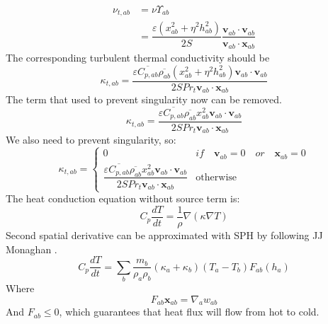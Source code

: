 \documentclass[journal abbreviation, manuscript]{copernicus}
\begin{document}
\begin{equation}
\begin{split}
\nu_{t,ab} &= \nu \Upsilon_{ab} \\
&= \dfrac{\varepsilon (x_{ab}^2 + \eta^2 h_{ab}^2)}{2 S} \dfrac{\textbf{v}_{ab} \cdot \textbf{v}_{ab}}{\textbf{v}_{ab} \cdot \textbf{x}_{ab}}
\end{split}
\end{equation}
The corresponding turbulent thermal conductivity should be
\begin{equation}
\kappa_{t,ab}=\dfrac{\varepsilon \overline{C_{p,ab}} \overline{\rho_{ab}} (x_{ab}^2 + \eta^2 h_{ab}^2) \textbf{v}_{ab} \cdot \textbf{v}_{ab}}{2 S Pr_t\textbf{v}_{ab} \cdot \textbf{x}_{ab}}
\end{equation}
The term that used to prevent singularity now can be removed. 
\begin{equation}
\kappa_{t,ab}=\dfrac{\varepsilon \overline{C_{p,ab}} \overline{\rho_{ab}} x_{ab}^2 \textbf{v}_{ab} \cdot \textbf{v}_{ab}}{2 S Pr_t\textbf{v}_{ab} \cdot \textbf{x}_{ab} }
\end{equation}
We also need to prevent singularity, so: 
\begin{equation}
\kappa_{t,ab}= 
\begin{cases} 
      0 & if  \quad \textbf{v}_{ab}=0 \quad or \quad \textbf{x}_{ab}=0 \\
      \dfrac{\varepsilon \overline{C_{p,ab}} \overline{\rho_{ab}} x_{ab}^2 \textbf{v}_{ab} \cdot \textbf{v}_{ab}}{2 S Pr_t\textbf{v}_{ab} \cdot \textbf{x}_{ab} } & \text{otherwise}
\end{cases}
\label{eq:SPH-LANS-heat-conductivity}
\end{equation}
The heat conduction equation without source term is:
\begin{equation}
C_p \dfrac{dT}{dt} = \dfrac{1}{\rho} \nabla (\kappa \nabla T)
\end{equation}
Second spatial derivative can be approximated with SPH by following JJ Monaghan \citep{monaghan2005smoothed}. 
\begin{equation}
C_p \dfrac{dT}{dt} = \sum_b \dfrac{m_b}{\rho_a \rho_b} (\kappa_a + \kappa_b) (T_a - T_b) F_{ab} (h_a)
\end{equation}
Where
\begin{equation}
F_{ab} \textbf{x}_{ab} = \nabla _a w_{ab}
\end{equation}
And  $F_{ab} \leq 0$, which guarantees that heat flux will flow from hot to cold.
\end{document}
